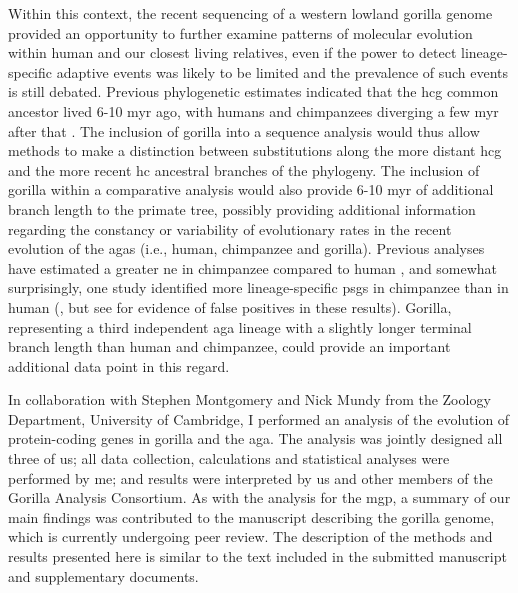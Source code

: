 Within this context, the recent sequencing of a western lowland
gorilla genome provided an opportunity to further examine patterns of
molecular evolution within human and our closest living relatives,
even if the power to detect lineage-specific adaptive events was
likely to be limited and the prevalence of such events is still
debated. Previous phylogenetic estimates indicated that the \ac{hcg}
common ancestor lived 6-10 \ac{myr} ago, with humans and chimpanzees
diverging a few \ac{myr} after that \citep{Bradley2008}. The inclusion
of gorilla into a sequence analysis would thus allow methods to make a
distinction between substitutions along the more distant \ac{hcg} and
the more recent \ac{hc} ancestral branches of the phylogeny. The
inclusion of gorilla within a comparative analysis would also provide
6-10 \ac{myr} of additional branch length to the primate tree,
possibly providing additional information regarding the constancy or
variability of evolutionary rates in the recent evolution of the
\acp{aga} (i.e., human, chimpanzee and gorilla). Previous analyses have
estimated a greater \ac{ne} in chimpanzee compared to human
\citep{Sequencing2005a,Siepel2009a}, and somewhat surprisingly, one
study identified more lineage-specific \acp{psg} in chimpanzee than in
human (\citet{Bakewell2007}, but see \citet{Mallick2009} for evidence
of false positives in these results). Gorilla, representing a third
independent \ac{aga} lineage with a slightly longer terminal branch
length than human and chimpanzee, could provide an important
additional data point in this regard.

In collaboration with Stephen Montgomery and Nick Mundy from the
Zoology Department, University of Cambridge, I performed an analysis
of the evolution of protein-coding genes in gorilla and the
\ac{aga}. The analysis was jointly designed all three of us; all data
collection, calculations and statistical analyses were performed by
me; and results were interpreted by us and other members of the
Gorilla Analysis Consortium. As with the analysis for the \acl{mgp}, a
summary of our main findings was contributed to the manuscript
describing the gorilla genome, which is currently undergoing peer
review. The description of the methods and results presented here is
similar to the text included in the submitted manuscript and
supplementary documents.

